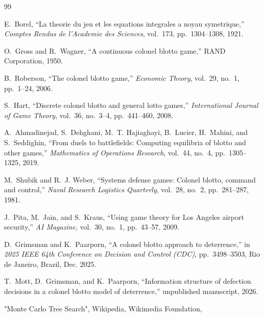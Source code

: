 \documentclass[letterpaper, 10 pt, conference]{ieeeconf}  %
\begin{document}
\begin{thebibliography}{99}

E.~Borel, ``La theorie du jeu et les equations integrales a noyau symetrique,''
\emph{Comptes Rendus de l'Academie des Sciences}, vol.~173, pp.~1304--1308, 1921.

O.~Gross and R.~Wagner, ``A continuous colonel blotto game,'' RAND Corporation, 1950.

B.~Roberson, ``The colonel blotto game,'' \emph{Economic Theory}, vol.~29, no.~1,
pp.~1--24, 2006.

S.~Hart, ``Discrete colonel blotto and general lotto games,''
\emph{International Journal of Game Theory}, vol.~36, no.~3--4, pp.~441--460, 2008.

A.~Ahmadinejad, S.~Dehghani, M.~T. Hajiaghayi, B.~Lucier, H.~Mahini, and
S.~Seddighin, ``From duels to battlefields: Computing equilibria of blotto and
other games,'' \emph{Mathematics of Operations Research}, vol.~44, no.~4,
pp.~1305--1325, 2019.

M.~Shubik and R.~J. Weber, ``Systems defense games: Colonel blotto, command and
control,'' \emph{Naval Research Logistics Quarterly}, vol.~28, no.~2,
pp.~281--287, 1981.

J.~Pita, M.~Jain, and S.~Kraus, ``Using game theory for Los Angeles airport
security,'' \emph{AI Magazine}, vol.~30, no.~1, pp.~43--57, 2009.

D.~Grimsman and K.~Paarporn, ``A colonel blotto approach to deterrence,'' in
\emph{2025 IEEE 64th Conference on Decision and Control (CDC)}, pp.~3498--3503,
Rio de Janeiro, Brazil, Dec. 2025.

T.~Mott, D.~Grimsman, and K.~Paarporn, ``Information structure of defection
decisions in a colonel blotto model of deterrence,'' unpublished manuscript,
2026.

"Monte Carlo Tree Search", Wikipedia, Wikimedia Foundation,

\end{thebibliography}
\end{document}
